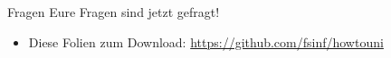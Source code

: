 \documentclass{beamer}
\begin{document}

\begin{frame}{Fragen}
    \centering Eure Fragen sind jetzt gefragt!
    \vspace{2cm}
    \begin{itemize}
        \item \small Diese Folien zum Download: \url{https://github.com/fsinf/howtouni}
    \end{itemize}
\end{frame}
\end{document}

